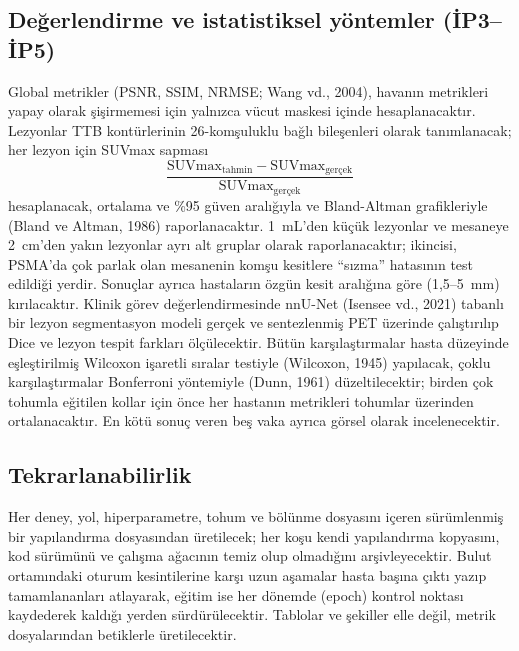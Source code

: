 \documentclass[11pt,a4paper]{article}
\begin{document}
\subsection{Değerlendirme ve istatistiksel yöntemler (İP3--İP5)}
Global metrikler (PSNR, SSIM, NRMSE; Wang vd., 2004), havanın metrikleri yapay olarak
şişirmemesi için yalnızca vücut maskesi içinde hesaplanacaktır. Lezyonlar TTB kontürlerinin
26-komşuluklu bağlı bileşenleri olarak tanımlanacak; her lezyon için SUVmax sapması
\[
  \frac{\mathrm{SUVmax}_{\text{tahmin}} - \mathrm{SUVmax}_{\text{gerçek}}}{\mathrm{SUVmax}_{\text{gerçek}}}
\]
hesaplanacak, ortalama ve \%95 güven aralığıyla ve Bland-Altman
grafikleriyle (Bland ve Altman, 1986) raporlanacaktır. 1~mL'den küçük lezyonlar ve mesaneye
2~cm'den yakın lezyonlar ayrı alt gruplar olarak raporlanacaktır; ikincisi, PSMA'da çok parlak
olan mesanenin komşu kesitlere ``sızma'' hatasının test edildiği yerdir. Sonuçlar ayrıca
hastaların özgün kesit aralığına göre (1,5--5~mm) kırılacaktır. Klinik görev değerlendirmesinde
nnU-Net (Isensee vd., 2021) tabanlı bir lezyon segmentasyon modeli gerçek ve sentezlenmiş PET
üzerinde çalıştırılıp Dice ve lezyon tespit farkları ölçülecektir. Bütün karşılaştırmalar hasta
düzeyinde eşleştirilmiş Wilcoxon işaretli sıralar testiyle (Wilcoxon, 1945) yapılacak, çoklu
karşılaştırmalar Bonferroni yöntemiyle (Dunn, 1961) düzeltilecektir; birden çok tohumla eğitilen
kollar için önce her hastanın metrikleri tohumlar üzerinden ortalanacaktır. En kötü sonuç veren
beş vaka ayrıca görsel olarak incelenecektir.

\subsection{Tekrarlanabilirlik}
Her deney, yol, hiperparametre, tohum ve bölünme dosyasını içeren sürümlenmiş bir yapılandırma
dosyasından üretilecek; her koşu kendi yapılandırma kopyasını, kod sürümünü ve çalışma ağacının
temiz olup olmadığını arşivleyecektir. Bulut ortamındaki oturum kesintilerine karşı uzun aşamalar
hasta başına çıktı yazıp tamamlananları atlayarak, eğitim ise her dönemde (epoch) kontrol noktası
kaydederek kaldığı yerden sürdürülecektir. Tablolar ve şekiller elle değil, metrik dosyalarından
betiklerle üretilecektir.
\end{document}
